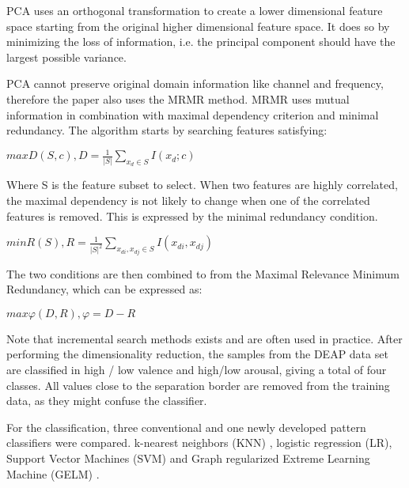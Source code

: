 \npar

PCA uses an orthogonal transformation to create a lower dimensional feature space starting from the original higher dimensional feature space. It does so by minimizing the loss of information, i.e. the principal component should have the largest possible variance. 

\npar

PCA cannot preserve original domain information like channel and frequency, therefore the paper also uses the MRMR method. MRMR uses mutual information in combination with maximal dependency criterion and minimal redundancy. The algorithm starts by searching features satisfying:

\begin{center}
$max D(S,c), D=\frac{1}{|S|} {\displaystyle \sum_{x_d \in S}} I(x_d;c)$
\end{center}

Where S is the feature subset to select. When two features are highly correlated, the maximal dependency is not likely to change when one of the correlated features is removed. This is expressed by the minimal redundancy condition.

\begin{center}
$min R(S), R = \frac{1}{|S|^2} {\displaystyle \sum_{x_{di}, x_{dj} \in S}} I(x_{di},x_{dj})$
\end{center}

The two conditions are then combined to from the Maximal Relevance Minimum Redundancy, which can be expressed as:

\begin{center}
$max \varphi(D,R), \varphi=D-R$
\end{center}
Note that incremental search methods exists and are often used in practice. After performing the dimensionality reduction, the samples from the DEAP data set are classified in high / low valence and high/low arousal, giving a total of four classes. All values close to the separation border are removed from the training data, as they might confuse the classifier. 

\npar 
For the classification, three conventional and one newly developed pattern classifiers were compared. k-nearest neighbors (KNN) , logistic regression (LR), Support Vector Machines (SVM) and Graph regularized Extreme Learning Machine (GELM) . 

\npar

